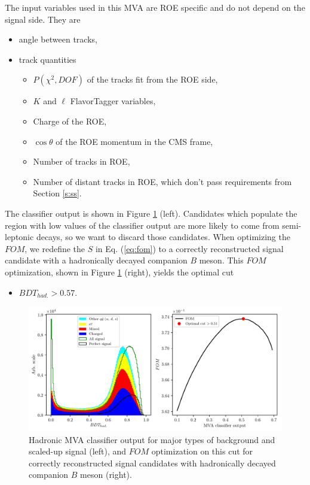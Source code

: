 \documentclass[headings=standardclasses,headings=big,oneside,a4paper,openany,12pt]{scrbook}
\begin{document}
The input variables used in this MVA are ROE specific and do not depend on the signal side. They are
\begin{itemize}
\item angle between tracks,
\item track quantities
	\begin{itemize}
	\item $P(\chi^2,DOF)$ of the tracks fit from the ROE side,
	\item $K$ and $\ell$ FlavorTagger variables,
	\item Charge of the ROE,
	\item $\cos \theta$ of the ROE momentum in the CMS frame,
	\item Number of tracks in ROE,
	\item Number of distant tracks in ROE, which don't pass requirements from Section \ref{s:ss}.
	\end{itemize}
\end{itemize}
%
The classifier output is shown in Figure \ref{fig:hdmva} (left). Candidates which populate the region with low values of the classifier output are more likely to come from semi-leptonic decays, so we want to discard those candidates. When optimizing the $FOM$, we redefine the $S$ in Eq. (\ref{eq:fom}) to a correctly reconstructed signal candidate with a hadronically decayed companion $B$ meson. This $FOM$ optimization, shown in Figure \ref{fig:hdmva} (right), yields the optimal cut
\begin{itemize}
\item $BDT_{had.} > 0.57.$
\end{itemize} 

\begin{figure}[H]
\centering
\captionsetup{width=0.8\linewidth}
\includegraphics[width=\linewidth]{fig/hdmva_opt}
\caption{Hadronic MVA classifier output for major types of background and scaled-up signal (left), and $FOM$ optimization on this cut for correctly reconstructed signal candidates with hadronically decayed companion $B$ meson (right).}
\label{fig:hdmva}
\end{figure}
\end{document}
